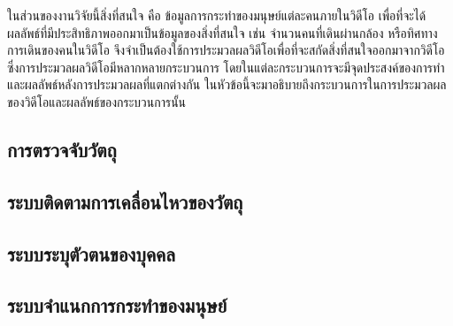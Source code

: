 ในส่วนของงานวิจัยนี้สิ่งที่สนใจ คือ ข้อมูลการกระทำของมนุษย์แต่ละคนภายในวิดีโอ เพื่อที่จะได้ผลลัพธ์ที่มีประสิทธิภาพออกมาเป็นข้อมูลของสิ่งที่สนใจ เช่น จำนวนคนที่เดินผ่านกล้อง 
หรือทิศทางการเดินของคนในวิดีโอ จึงจำเป็นต้องใช้การประมวลผลวิดีโอเพื่อที่จะสกัดสิ่งที่สนใจออกมาจากวิดีโอ ซึ่งการประมวลผลวิดีโอมีหลากหลายกระบวนการ 
โดยในแต่ละกระบวนการจะมีจุดประสงค์ของการทำและผลลัพธ์หลังการประมวลผลที่แตกต่างกัน ในหัวข้อนี้จะมาอธิบายถึงกระบวนการในการประมวลผลของวิดีโอและผลลัพธ์ของกระบวนการนั้น
\subsection{การตรวจจับวัตถุ}


\subsection{ระบบติดตามการเคลื่อนไหวของวัตถุ}


\clearpage
\subsection{ระบบระบุตัวตนของบุคคล}


\clearpage
\subsection{ระบบจำแนกการกระทำของมนุษย์}
